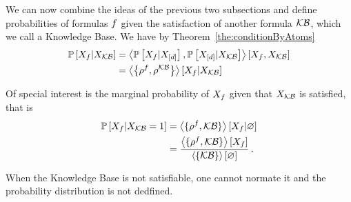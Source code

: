 We can now combine the ideas of the previous two subsections and define probabilities of formulas $f$ given the satisfaction of another formula $\mathcal{KB}$, which we call a Knowledge Base.
We have by Theorem~\ref{the:conditionByAtoms} %
\begin{align*}
	\mathbb{P}\left[X_{f}|X_{\mathcal{KB}}\right] 
	& = \left\langle 
	\mathbb{P}\left[X_{f}|X_{[d]}\right], \mathbb{P}\left[X_{[d]}|X_{\mathcal{KB}}\right]
	\right\rangle \left[ X_{f},X_{\mathcal{KB}} \right] \\
	& = \left\langle \left\{\rho^{f} , \rho^{\mathcal{KB}}\right\}\right\rangle \left[ X_{f} | X_{\mathcal{KB}} \right]
\end{align*}

% 
Of special interest is the marginal probability of $X_{f}$ given that $X_{\mathcal{KB}}$ is satisfied, that is
\begin{align*}
	\mathbb{P}\left[X_{f}|X_{\mathcal{KB}}=1\right] 
	& = \left\langle \{\rho^{f} ,\mathcal{KB}\}\right\rangle \left[ X_{f} | \varnothing \right]\\
	& = \frac{\left\langle \{\rho^{f},\mathcal{KB}\}\right\rangle \left[ X_{f} \right]}{\left\langle \{\mathcal{KB}\}\right\rangle \left[ \varnothing \right]} \, . 
\end{align*}


\begin{remark}
	When the Knowledge Base is not satisfiable, one cannot normate it and the probability distribution is not dedfined.
\end{remark}




